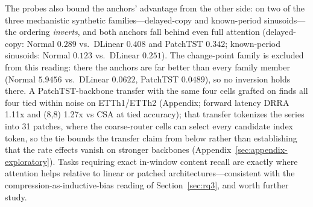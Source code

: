 The probes also bound the anchors' advantage from the other side: on two of the
three mechanistic synthetic families---delayed-copy and known-period sinusoids---the
ordering \emph{inverts}, and both
anchors fall behind even full attention (delayed-copy: Normal $0.289$ vs.\
DLinear $0.408$ and PatchTST $0.342$; known-period sinusoids: Normal
$0.123$ vs.\ DLinear $0.251$). The change-point family is excluded from this reading:
there the anchors are far better than every family member (Normal $5.9456$ vs.\
DLinear $0.0622$, PatchTST $0.0489$), so no inversion holds there. A PatchTST-backbone transfer with the same four cells grafted on finds all four tied within noise on ETTh1/ETTh2 (Appendix; forward latency DRRA 1.11x and (8,8) 1.27x vs CSA at tied accuracy); that transfer tokenizes the series into 31 patches, where the coarse-router cells can select every candidate index token, so the tie bounds the transfer claim from below rather than establishing that the rate effects vanish on stronger backbones (Appendix~\ref{sec:appendix-exploratory}). Tasks requiring exact in-window content
recall are exactly where attention helps relative to linear or patched
architectures---consistent with the compression-as-inductive-bias reading
of Section~\ref{sec:rq3}, and worth further study.

